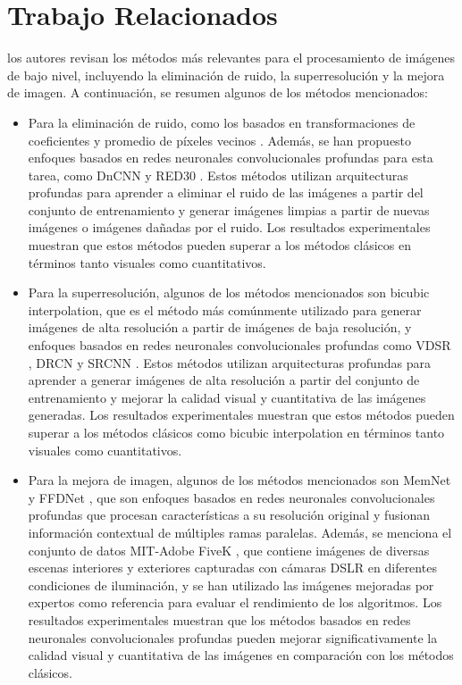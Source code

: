 \documentclass[a4paper,
               ]{jacow}
\begin{document}
\section{Trabajo Relacionados}
 los autores revisan los métodos más relevantes para el procesamiento de imágenes de bajo nivel, incluyendo la eliminación de ruido, la superresolución y la mejora de imagen. A continuación, se resumen algunos de los métodos mencionados:
\begin{itemize}[label=-]
    \item Para la eliminación de ruido, como los basados en transformaciones de coeficientes y promedio de píxeles vecinos \cite{zhang2017beyond}. Además, se han propuesto enfoques basados en redes neuronales convolucionales profundas para esta tarea, como DnCNN \cite{zhang2017beyond} y RED30 \cite{mao2019red30}. Estos métodos utilizan arquitecturas profundas para aprender a eliminar el ruido de las imágenes a partir del conjunto de entrenamiento y generar imágenes limpias a partir de nuevas imágenes o imágenes dañadas por el ruido. Los resultados experimentales muestran que estos métodos pueden superar a los métodos clásicos en términos tanto visuales como cuantitativos.
    \item Para la superresolución, algunos de los métodos mencionados son bicubic interpolation, que es el método más comúnmente utilizado para generar imágenes de alta resolución a partir de imágenes de baja resolución, y enfoques basados en redes neuronales convolucionales profundas como VDSR \cite{vdsr}, DRCN \cite{kim2016deeply} y SRCNN \cite{dong2016image}. Estos métodos utilizan arquitecturas profundas para aprender a generar imágenes de alta resolución a partir del conjunto de entrenamiento y mejorar la calidad visual y cuantitativa de las imágenes generadas. Los resultados experimentales muestran que estos métodos pueden superar a los métodos clásicos como bicubic interpolation en términos tanto visuales como cuantitativos.
    \item Para la mejora de imagen,  algunos de los métodos mencionados son MemNet \cite{tai2017memnet} y FFDNet \cite{zhang2018ffdnet}, que son enfoques basados en redes neuronales convolucionales profundas que procesan características a su resolución original y fusionan información contextual de múltiples ramas paralelas. Además, se menciona el conjunto de datos MIT-Adobe FiveK \cite{dabov2007image}, que contiene imágenes de diversas escenas interiores y exteriores capturadas con cámaras DSLR en diferentes condiciones de iluminación, y se han utilizado las imágenes mejoradas por expertos como referencia para evaluar el rendimiento de los algoritmos. Los resultados experimentales muestran que los métodos basados en redes neuronales convolucionales profundas pueden mejorar significativamente la calidad visual y cuantitativa de las imágenes en comparación con los métodos clásicos.
\end{itemize}
\end{document}
